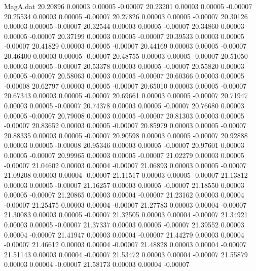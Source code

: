 \begin{filecontents}{MagA.dat}
  20.20896    0.00003    0.00005   -0.00007
  20.23201    0.00003    0.00005   -0.00007
  20.25534    0.00003    0.00005   -0.00007
  20.27826    0.00003    0.00005   -0.00007
  20.30126    0.00003    0.00005   -0.00007
  20.32544    0.00003    0.00005   -0.00007
  20.34860    0.00003    0.00005   -0.00007
  20.37199    0.00003    0.00005   -0.00007
  20.39533    0.00003    0.00005   -0.00007
  20.41829    0.00003    0.00005   -0.00007
  20.44169    0.00003    0.00005   -0.00007
  20.46400    0.00003    0.00005   -0.00007
  20.48755    0.00003    0.00005   -0.00007
  20.51050    0.00003    0.00005   -0.00007
  20.53378    0.00003    0.00005   -0.00007
  20.55820    0.00003    0.00005   -0.00007
  20.58063    0.00003    0.00005   -0.00007
  20.60366    0.00003    0.00005   -0.00008
  20.62797    0.00003    0.00005   -0.00007
  20.65010    0.00003    0.00005   -0.00007
  20.67343    0.00003    0.00005   -0.00007
  20.69661    0.00003    0.00005   -0.00007
  20.71947    0.00003    0.00005   -0.00007
  20.74378    0.00003    0.00005   -0.00007
  20.76680    0.00003    0.00005   -0.00007
  20.79008    0.00003    0.00005   -0.00007
  20.81303    0.00003    0.00005   -0.00007
  20.83652    0.00003    0.00005   -0.00007
  20.85979    0.00003    0.00005   -0.00007
  20.88335    0.00003    0.00005   -0.00007
  20.90598    0.00003    0.00005   -0.00007
  20.92888    0.00003    0.00005   -0.00008
  20.95346    0.00003    0.00005   -0.00007
  20.97601    0.00003    0.00005   -0.00007
  20.99965    0.00003    0.00005   -0.00007
  21.02279    0.00003    0.00005   -0.00007
  21.04602    0.00003    0.00004   -0.00007
  21.06893    0.00003    0.00005   -0.00007
  21.09208    0.00003    0.00004   -0.00007
  21.11517    0.00003    0.00005   -0.00007
  21.13812    0.00003    0.00005   -0.00007
  21.16257    0.00003    0.00005   -0.00007
  21.18550    0.00003    0.00005   -0.00007
  21.20865    0.00003    0.00004   -0.00007
  21.23162    0.00003    0.00004   -0.00007
  21.25475    0.00003    0.00004   -0.00007
  21.27783    0.00003    0.00004   -0.00007
  21.30083    0.00003    0.00005   -0.00007
  21.32505    0.00003    0.00004   -0.00007
  21.34921    0.00003    0.00005   -0.00007
  21.37337    0.00003    0.00005   -0.00007
  21.39552    0.00003    0.00004   -0.00007
  21.41947    0.00003    0.00004   -0.00007
  21.44279    0.00003    0.00004   -0.00007
  21.46612    0.00003    0.00004   -0.00007
  21.48828    0.00003    0.00004   -0.00007
  21.51143    0.00003    0.00004   -0.00007
  21.53472    0.00003    0.00004   -0.00007
  21.55879    0.00003    0.00004   -0.00007
  21.58173    0.00003    0.00004   -0.00007

\end{filecontents}
